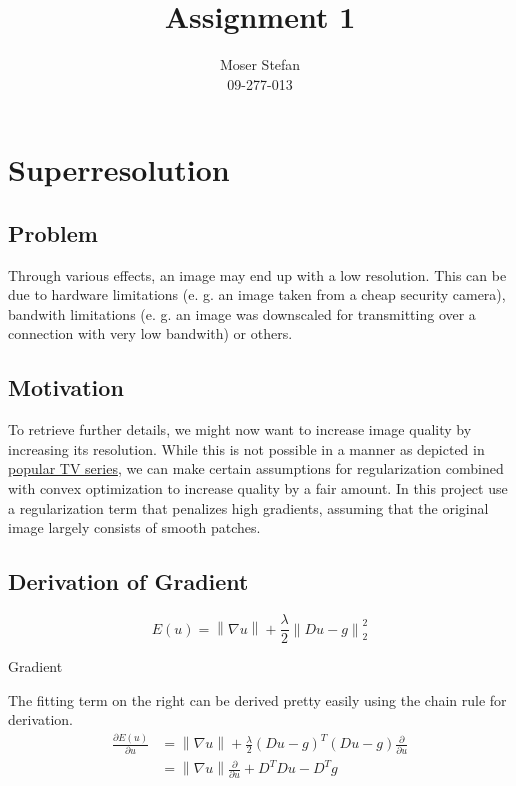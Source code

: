 \documentclass{paper}
\title{Assignment 1}
\author{Moser Stefan\\09-277-013}
\newcommand{\norm}[1]{\left\lVert#1\right\rVert}
\begin{document}
\maketitle


%

\section*{Superresolution}

\subsection*{Problem}
Through various effects, an image may end up with a low resolution. 
This can be due to hardware limitations 
(e. g. an image taken from a cheap security camera), 
bandwith limitations 
(e. g. an image was downscaled for transmitting over a connection with very low bandwith) or others.  


\subsection*{Motivation}
To retrieve further details, we might now want to increase image quality by increasing its resolution. 
While this is not possible in a manner as depicted in \href{http://petapixel.com/2012/08/17/ridiculous-photo-enhancement-scene-from-the-tv-show-csi/}{popular TV series}, 
we can make certain assumptions for regularization combined with convex optimization to increase quality by a fair amount. 
In this project use a regularization term that penalizes high gradients,
assuming that the original image largely consists of smooth patches.

\subsection*{Derivation of Gradient}
\begin{equation}
E(u) = \norm{\nabla u} + \frac{\lambda}{2} \norm{Du - g}^2_2
\end{equation}

Gradient

The fitting term on the right can be derived pretty easily using the chain rule for derivation.
\begin{align}
\frac{\partial E(u)}{\partial u} 
&= \norm{\nabla u} + \frac{\lambda}{2} (Du - g)^T(Du - g) \frac{\partial}{\partial u} \\
&= \norm{\nabla u} \frac{\partial}{\partial u} + D^T D u - D^T g
\end{align}
\end{document}
